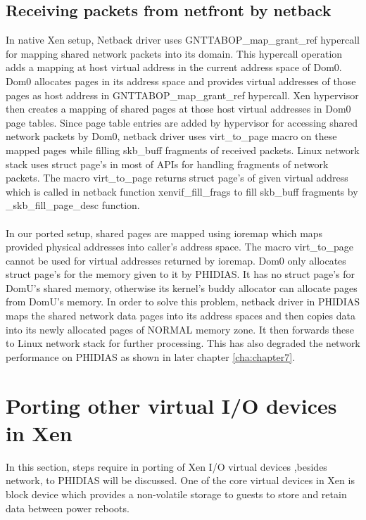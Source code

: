 \subsection{Receiving packets from netfront by netback \label{sec:rxnetfront}}
In native Xen setup, Netback driver uses GNTTABOP\_map\_grant\_ref hypercall for mapping shared network packets into its domain. This hypercall operation adds a mapping at host virtual address in the current address space of Dom0. Dom0 allocates pages in its address space and provides virtual addresses of those pages as host address in  GNTTABOP\_map\_grant\_ref hypercall. Xen hypervisor then creates a mapping of shared pages at those host virtual addresses in Dom0 page tables. Since page table entries are added by hypervisor for accessing shared network packets by Dom0, netback driver uses virt\_to\_page macro on these mapped pages while filling skb\_buff fragments of received packets. Linux network stack uses struct page's in most of APIs for handling fragments of network packets. The macro virt\_to\_page returns struct page's of given virtual address which is called in netback function xenvif\_fill\_frags to fill skb\_buff fragments by \_skb\_fill\_page\_desc function.
\\
\\
In our ported setup, shared pages are mapped using ioremap which maps provided physical addresses into caller's address space. The macro virt\_to\_page cannot be used for virtual addresses returned by ioremap. Dom0 only allocates struct page's for the memory given to it by PHIDIAS. It has no struct page's for DomU's shared memory, otherwise its kernel's buddy allocator  \cite{buddy} can allocate pages from DomU's memory. In order to solve this problem, netback driver in PHIDIAS maps the shared network data pages into its address spaces and then copies data into its newly allocated pages of NORMAL memory zone. It then forwards these to Linux network stack for further processing. This has also degraded the network performance on PHIDIAS as shown in later chapter \ref{cha:chapter7}.

\section{Porting other virtual I/O devices in Xen \label{sec:otherio}}
In this section, steps require in porting of Xen I/O virtual devices ,besides network, to PHIDIAS will be discussed.  One of the core virtual devices in Xen is block device which provides a non-volatile storage to guests to store and retain data between power reboots.

